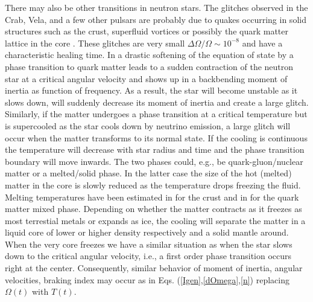 \begin{multicols}{2}
There may also be other transitions in neutron stars. The glitches
observed in the Crab, Vela, and a few other pulsars are probably due
to quakes occurring in solid structures such as the crust, 
superfluid vortices or possibly the quark matter lattice in the
core \cite{HH}. These glitches are very small $\Delta\Omega/\Omega\sim
10^{-8}$ and have a characteristic healing time.  In \cite{GPW} a
drastic softening of the equation of state by a phase
transition to quark matter leads to a sudden contraction of the
neutron star at a critical angular velocity and shows up in a
backbending moment of inertia as function of frequency. As a result,
the star will become unstable as it slows down, will suddenly decrease
its moment of inertia and create a large glitch. Similarly, if the
matter undergoes a phase transition at a critical temperature but is
supercooled as the star cools down by neutrino emission, a large
glitch will occur when the matter transforms to its normal state. If
the cooling is continuous the temperature will decrease with star
radius and time and the phase transition boundary will move inwards.
The two phases could, e.g., be quark-gluon/nuclear matter
or a melted/solid phase. In the latter case the size of the hot
(melted) matter in the core is slowly reduced as the temperature drops
freezing the fluid. Melting temperatures have been estimated in
\cite{LPR,melt} for the crust and in \cite{HPS} for the quark matter
mixed phase.  Depending on whether the matter contracts as it freezes
as most terrestial metals or expands as ice, the cooling will separate
the matter in a liquid core of lower or higher density respectively
and a solid mantle around.  When the very core freezes we have a
similar situation as when the star slows down to the critical angular
velocity, i.e., a first order phase transition occurs right at the
center. Consequently, similar behavior of moment of inertia, angular
velocities, braking index may occur as in
Eqs. (\ref{Igen},\ref{dOmega},\ref{n}) replacing $\Omega(t)$ with
$T(t)$.


\end{multicols}
